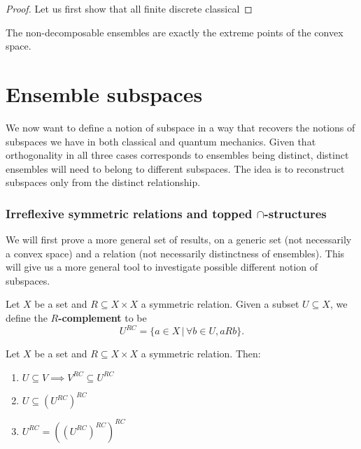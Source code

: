 \begin{proof}
	Let us first show that all finite discrete classical 
\end{proof}

\begin{remark}
	The non-decomposable ensembles are exactly the extreme points of the convex space.
\end{remark}


\section{Ensemble subspaces}

We now want to define a notion of subspace in a way that recovers the notions of subspaces we have in both classical and quantum mechanics. Given that orthogonality in all three cases corresponds to ensembles being distinct, distinct ensembles will need to belong to different subspaces. The idea is to reconstruct subspaces only from the distinct relationship.

\subsubsection{Irreflexive symmetric relations and topped $\cap$-structures}

We will first prove a more general set of results, on a generic set (not necessarily a convex space) and a relation (not necessarily distinctness of ensembles). This will give us a more general tool to investigate possible different notion of subspaces.

\begin{defn}
	Let $X$ be a set and $R \subseteq X \times X$ a symmetric relation. Given a subset $U \subseteq X$, we define the \textbf{$R$-complement} to be
	$$ U^{RC} = \{ a \in X \, | \, \forall b \in U, aRb  \}. $$
\end{defn}

\begin{prop}\label{pm_es_rComplProps}
	Let $X$ be a set and $R \subseteq X \times X$ a symmetric relation. Then:
	\begin{enumerate}
		\item $U \subseteq V \implies V^{RC} \subseteq U^{RC}$
		\item $U \subseteq (U^{RC})^{RC}$
		\item $U^{RC} = ((U^{RC})^{RC})^{RC}$
	\end{enumerate}
\end{prop}

